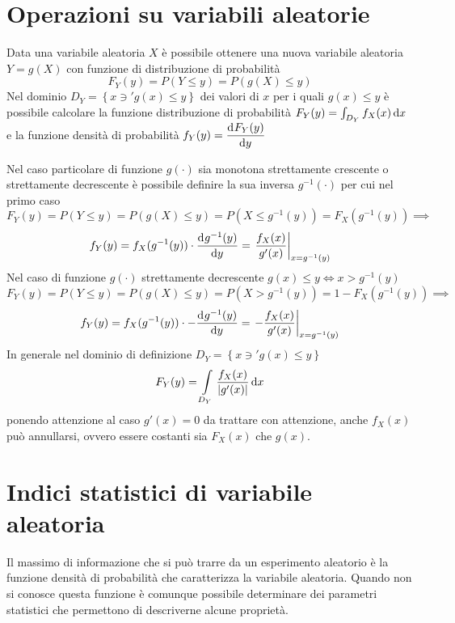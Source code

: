 \section{Operazioni su variabili aleatorie}
Data una variabile aleatoria $X$ è possibile ottenere una nuova variabile aleatoria $Y=g(X)$ con funzione di distribuzione di probabilità
\begin{equation}F_Y(y)=P(Y\leq y)=P(g(X)\leq y)\end{equation}
Nel dominio $D_Y=\left\lbrace x\ni' g(x)\leq y\right\rbrace$ dei valori di $x$ per i quali $g(x)\leq y$ è possibile calcolare la funzione distribuzione di probabilità $F_Y(y)=\int_{D_Y}{f_X(x)\mathop{}\!\mathrm{d} x}$ e la funzione densità di probabilità $f_Y(y)=\dfrac{\mathop{}\!\mathrm{d}^{}F_Y(y)}{\mathop{}\!\mathrm{d} y^{}}$

Nel caso particolare di funzione $g(\cdot)$ sia monotona strettamente crescente o strettamente decrescente è possibile definire la sua inversa $g^{-1}(\cdot)$ per cui nel primo caso
\[F_Y(y)=P(Y\leq y)=P(g(X)\leq y)=P(X\leq g^{-1}(y))=F_X(g^{-1}(y))\implies\]
\begin{equation}
f_Y(y)=f_X(g^{-1}(y))\cdot\dfrac{\mathop{}\!\mathrm{d}^{}g^{-1}(y)}{\mathop{}\!\mathrm{d} y^{}}=\left.{\frac{f_X(x)}{g'(x)}}\right\rvert_{x=g^{-1}(y)}
\end{equation}
Nel caso di funzione $g(\cdot)$ strettamente decrescente $g(x)\leq y\iff x>g^{-1}(y)$
\[F_Y(y)=P(Y\leq y)=P(g(X)\leq y)=P(X>g^{-1}(y))=1-F_X(g^{-1}(y))\implies\]
\begin{equation}
f_Y(y)=f_X(g^{-1}(y))\cdot-\dfrac{\mathop{}\!\mathrm{d}^{}g^{-1}(y)}{\mathop{}\!\mathrm{d} y^{}}=\left.{-\frac{f_X(x)}{g'(x)}}\right\rvert_{x=g^{-1}(y)}
\end{equation}
In generale nel dominio di definizione $D_Y=\left\lbrace x\ni' g(x)\leq y\right\rbrace$
\begin{equation}
F_Y(y)=\int\limits_{D_Y}{\frac{f_X(x)}{\left|{g'(x)}\right|}\mathop{}\!\mathrm{d} x}
\end{equation}
ponendo attenzione al caso $g'(x)=0$ da trattare con attenzione, anche $f_X(x)$ può annullarsi, ovvero essere costanti sia $F_X(x)$ che $g(x)$.

\section{Indici statistici di variabile aleatoria}
Il massimo di informazione che si può trarre da un esperimento aleatorio è la funzione densità di probabilità che caratterizza la variabile aleatoria.
Quando non si conosce questa funzione è comunque possibile determinare dei parametri statistici che permettono di descriverne alcune proprietà.\\

